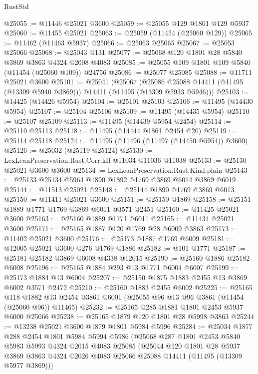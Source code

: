 \begin{lexlean}{RustStd}
\begin{coremodule}
@25055 := @11446 @25021 @3600
@25059 := @25055 @129 @1801 @129 @5937
@25060 := @11455 @25021
@25063 := @25059 (@11454 (@25060 @129))
@25065 := @11462 (@11463 @5937)
@25066 := @25063 @25065
@25067 := @25053 @25066
@25068 := @25043 @131
@25077 := @25068 @120 @1801 @28 @5840 @3869 @3863 @4324 @2008 @4083
@25085 := @25055 @109 @1801 @109 @5840 (@11454 (@25060 @109)) @24756
@25086 := @25077 @25085
@25088 := @11711 @25021 @3600
@25101 := @25041
    (@25067
      (@25086 @25088 @14411 (@11495 (@13309 @5940 @3869)))
      @14411
      (@11495 (@13309 @5933 @5946)))
@25103 := @14425 (@14426 @5954)
@25104 := @25101 @25103
@25106 := @11495 (@14430 @5954)
@25107 := @25104 @25106
@25109 := @11495 (@14435 @5954)
@25110 := @25107 @25109
@25113 := @11495 (@14439 @5954 @2454)
@25114 := @25110 @25113
@25118 := @11495 (@14444 @1861 @2454 @20)
@25119 := @25114 @25118
@25124 := @11495 (@11496 (@11497 (@14450 @5954)) @3600)
@25126 := @25032 (@25119 @25124)
@25130 := LexLeanPreservation.Rust.Corr.kIf @11034 @11036 @11038
@25133 := @25130 @25021 @3600 @3600
@25134 := LexLeanPreservation.Rust.Kind.plain
@25143 := @25133 @25134 @5964 @1890 @1892 @1769 @3869 @6014 @3869 @6019
@25144 := @11513 @25021
@25148 := @25144 @1890 @1769 @3869 @6013
@25150 := @11411 @25021 @3600
@25151 := @25150 @1869
@25158 := @25151 @1889 @1771 @1769 @3869 @6011 @3571 @2451
@25160 := @11425 @25021 @3600
@25163 := @25160 @1889 @1771 @6011
@25165 := @11434 @25021 @3600
@25171 := @25165 @1887 @120 @1769 @28 @6009 @3863
@25173 := @11402 @25021 @3600
@25176 := @25173 @1887 @1769 @6009
@25181 := @12005 @25021 @3600 @276 @1769 @1886
@25182 := @101 @1771
@25187 := @25181 @25182 @3869 @6008 @4338 @12015
@25190 := @25160 @1886 @25182 @6008
@25196 := @25165 @1884 @293 @13 @1771 @6004 @6007
@25199 := @25173 @1884 @13 @6004
@25207 := @25150 @1875 @1883 @2455 @13 @3869 @6002 @3571 @2472
@25210 := @25160 @1883 @2455 @6002
@25225 := @25165
    @118
    @1882
    @13
    @2454
    @3861
    @6001
    (@25055 @96 @13 @96 @3861 (@11454 (@25060 @96)) @11465)
@25232 := @25165 @285 @1881 @1801 @2453 @5937 @6000 @25066
@25238 := @25165 @1879 @120 @1801 @28 @5998 @3863
@25244 := @13238 @25021 @3600 @1879 @1801 @5984 @5996
@25284 := @25034
    @1877
    @288
    @2454
    @1801
    @5984
    @5994
    @5986
    (@25068
      @287
      @1801
      @2453
      @5840
      @5983
      @5993
      @4324
      @2015
      @4083
      @25085
      (@25044
        @120
        @1801
        @28
        @5937
        @3869
        @3863
        @4324
        @2026
        @4083
        @25066
        @25088
        @14411
        (@11495 (@13309 @5977 @3869)))

\end{coremodule}
\end{lexlean}
